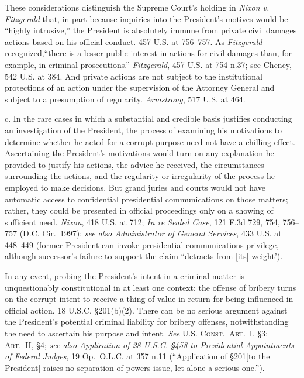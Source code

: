 These considerations distinguish the Supreme Court’s holding in \textit{Nixon v. Fitzgerald} that, in part because inquiries into the President’s motives would be “highly intrusive,” the President is absolutely immune from private civil damages actions based on his official conduct. 457 U.S. at 756--757.
As \textit{Fitzgerald} recognized,“there is a lesser public interest in actions for civil damages than, for example, in criminal prosecutions.”
\textit{Fitzgerald}, 457 U.S. at 754 n.37; see Cheney, 542 U.S. at 384.
And private actions are not subject to the institutional protections of an action under the supervision of the Attorney General and subject to a presumption of regularity.
\textit{Armstrong}, 517 U.S. at 464.

c. In the rare cases in which a substantial and credible basis justifies conducting an investigation of the President, the process of examining his motivations to determine whether he acted for a corrupt purpose need not have a chilling effect.
Ascertaining the President’s motivations would turn on any explanation he provided to justify his actions, the advice he received, the circumstances surrounding the actions, and the regularity or irregularity of the process he employed to make decisions.
But grand juries and courts would not have automatic access to confidential presidential communications on those matters; rather, they could be presented in official proceedings only on a showing of sufficient need.
\textit{Nixon}, 418 U.S. at 712;
\textit{In re Sealed Case}, 121 F.3d 729, 754, 756--757 (D.C. Cir.~1997);
\textit{see also Administrator of General Services}, 433 U.S. at 448--449 (former President can invoke presidential communications privilege, although successor’s failure to support the claim “detracts from [its] weight’).

In any event, probing the President’s intent in a criminal matter is unquestionably constitutional in at least one context: the offense of bribery turns on the corrupt intent to receive a thing of value in return for being influenced in official action.
18 U.S.C. \S 201(b)(2).
There can be no serious argument against the President’s potential criminal liability for bribery offenses, notwithstanding the need to ascertain his purpose and intent.
\textit{See} \textsc{U.S. Const.\ Art.~I}, \S 3; \textsc{Art.~II}, \S 4;
\textit{see also Application of 28 U.S.C. \S 458 to Presidential Appointments of Federal Judges}, 19 Op.\ O.L.C. at 357 n.11 (“Application of \S 201[to the President] raises no separation of powers issue, let alone a serious one.”).

